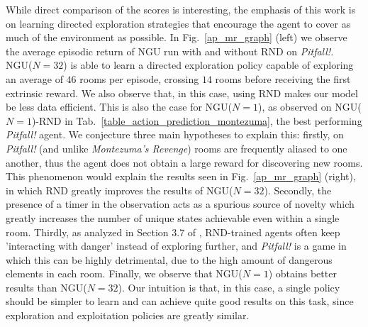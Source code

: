 \documentclass{article} %
\begin{document}
While direct comparison of the scores is interesting, the emphasis of this work is on learning directed exploration strategies that encourage the agent to cover as much of the environment as possible.
In Fig.~\ref{ap_mr_graph} (left) we observe the average episodic return of NGU run with and without RND on \textit{Pitfall!}. NGU($N=32$) is able to learn a directed exploration policy capable of exploring an average of $46$ rooms per episode, crossing $14$ rooms before receiving the first extrinsic reward. We also observe that, in this case, using RND makes our model be less data efficient. This is also the case for NGU($N=1$), as observed on NGU($N=1$)-RND in  Tab.~\ref{table_action_prediction_montezuma}, the best performing \textit{Pitfall!} agent. We conjecture three main hypotheses to explain this: firstly, on \textit{Pitfall!} (and unlike \textit{Montezuma's Revenge}) rooms are frequently aliased to one another, thus the agent does not obtain a large reward for discovering new rooms. This phenomenon would explain the results seen in Fig.~\ref{ap_mr_graph} (right), in which RND greatly improves the results of NGU($N=32$). Secondly, the presence of a timer in the observation acts as a spurious source of novelty which greatly increases the number of unique states achievable even within a single room. Thirdly, as analyzed in Section 3.7 of \cite{burda2018exploration}, RND-trained agents often keep 'interacting with danger' instead of exploring further, and \textit{Pitfall!} is a game in which this can be highly detrimental, due to the high amount of dangerous elements in each room.
Finally, we observe that NGU($N=1$) obtains better results than NGU($N=32$). Our intuition is that, in this case, a single policy should be simpler to learn and can achieve quite good results on this task, since exploration and exploitation policies are greatly similar.
\end{document}
